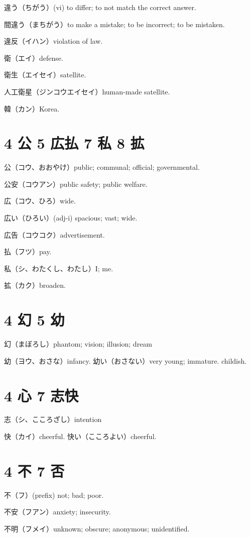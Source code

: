 違う（ちがう）(vi) to differ; to not match the correct answer.

間違う（まちがう）to make a mistake; to be incorrect; to be mistaken.

違反（イハン）violation of law.

衛（エイ）defense.

衛生（エイセイ）satellite.

人工衛星（ジンコウエイセイ）human-made satellite.

韓（カン）Korea.

\section{4 公 5 広払 7 私 8 拡}

公（コウ、おおやけ）public; communal; official; governmental.

公安（コウアン）public safety; public welfare.

広（コウ、ひろ）wide.

広い（ひろい）(adj-i) spacious; vast; wide.

広告（コウコク）advertisement.

払（フツ）pay.

私（シ、わたくし、わたし）I; me.

拡（カク）broaden.

\section{4 幻 5 幼}

幻（まぼろし）phantom; vision; illusion; dream

幼（ヨウ、おさな）infancy.
幼い（おさない）very young; immature. childish.

\section{4 心 7 志快}

志（シ、こころざし）intention

快（カイ）cheerful.
快い（こころよい）cheerful.

\section{4 不 7 否}

不（フ）(prefix) not; bad; poor.

不安（フアン）anxiety; insecurity.

不明（フメイ）unknown; obscure; anonymous; unidentified.

